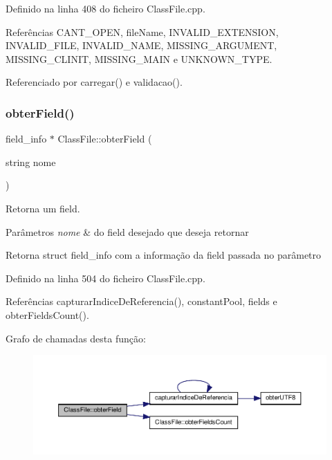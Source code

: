 Definido na linha 408 do ficheiro Class\+File.\+cpp.



Referências C\+A\+N\+T\+\_\+\+O\+P\+EN, file\+Name, I\+N\+V\+A\+L\+I\+D\+\_\+\+E\+X\+T\+E\+N\+S\+I\+ON, I\+N\+V\+A\+L\+I\+D\+\_\+\+F\+I\+LE, I\+N\+V\+A\+L\+I\+D\+\_\+\+N\+A\+ME, M\+I\+S\+S\+I\+N\+G\+\_\+\+A\+R\+G\+U\+M\+E\+NT, M\+I\+S\+S\+I\+N\+G\+\_\+\+C\+L\+I\+N\+IT, M\+I\+S\+S\+I\+N\+G\+\_\+\+M\+A\+IN e U\+N\+K\+N\+O\+W\+N\+\_\+\+T\+Y\+PE.



Referenciado por carregar() e validacao().

\mbox{\label{classClassFile_a1ae90b1662ca222c9910c14997b20eaa}} 
\subsubsection{\texorpdfstring{obter\+Field()}{obterField()}}
{\footnotesize\ttfamily field\+\_\+info $\ast$ Class\+File\+::obter\+Field (\begin{DoxyParamCaption}\item[{string}]{nome }\end{DoxyParamCaption})}



Retorna um field. 


\begin{DoxyParams}{Parâmetros}
{\em nome} & do field desejado que deseja retornar \\
\hline
\end{DoxyParams}
\begin{DoxyReturn}{Retorna}
struct field\+\_\+info com a informação da field passada no parâmetro 
\end{DoxyReturn}


Definido na linha 504 do ficheiro Class\+File.\+cpp.



Referências capturar\+Indice\+De\+Referencia(), constant\+Pool, fields e obter\+Fields\+Count().

Grafo de chamadas desta função\+:\nopagebreak
\begin{figure}[H]
\begin{center}
\leavevmode
\includegraphics[width=350pt]{classClassFile_a1ae90b1662ca222c9910c14997b20eaa_cgraph}
\end{center}
\end{figure}
\mbox{\label{classClassFile_ac3aabaa918413884416692b29165b463}} 
